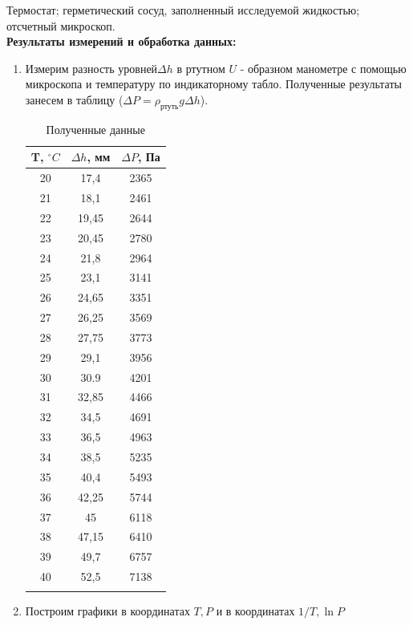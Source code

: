 \documentclass[a4paper, 12pt]{article}%
\begin{document}
	Термостат; герметический сосуд, заполненный исследуемой жидкостью; отсчетный микроскоп.\\
	
	
	\textbf{Результаты измерений и обработка данных: }
	\begin{enumerate}
	\item Измерим разность уровней$\Delta h $ в ртутном $U $ - образном манометре с помощью микроскопа и температуру по индикаторному табло. Полученные результаты занесем в таблицу ($\Delta P = \rho_{\text{ртуть}} g \Delta h $).
	
	\begin{longtable}{|c|c|c|}
		\hline
		T, $^\circ C$ & $\Delta h$, мм & $\Delta P$, Па \\ \hline
		20 & 17,4 & 2365 \\ \hline
		21 & 18,1 & 2461\\ \hline
		22 & 19,45 & 2644 \\ \hline
		23 & 20,45 & 2780 \\ \hline
		24 & 21,8 & 2964 \\ \hline
		25 & 23,1 & 3141 \\ \hline
		26 & 24,65 & 3351 \\ \hline
		27 & 26,25 & 3569 \\ \hline
		28 & 27,75 & 3773 \\ \hline
		29 & 29,1 & 3956 \\ \hline
		30 & 30.9 & 4201 \\ \hline
		31 & 32,85 & 4466 \\ \hline
		32 & 34,5 & 4691 \\ \hline
		33 & 36,5 & 4963 \\ \hline
		34 & 38,5 & 5235 \\ \hline
		35 & 40,4 & 5493 \\ \hline
		36 & 42,25 & 5744 \\ \hline
		37 & 45 & 6118 \\ \hline
		38 & 47,15 & 6410 \\ \hline
		39 & 49,7 & 6757\\ \hline
		40 & 52,5 & 7138\\ \hline
		\caption{Полученные данные}
	\end{longtable}
	\item Построим графики в координатах $T, P$ и в координатах $1/T, \ln P$
	

\end{enumerate}
\end{document}
